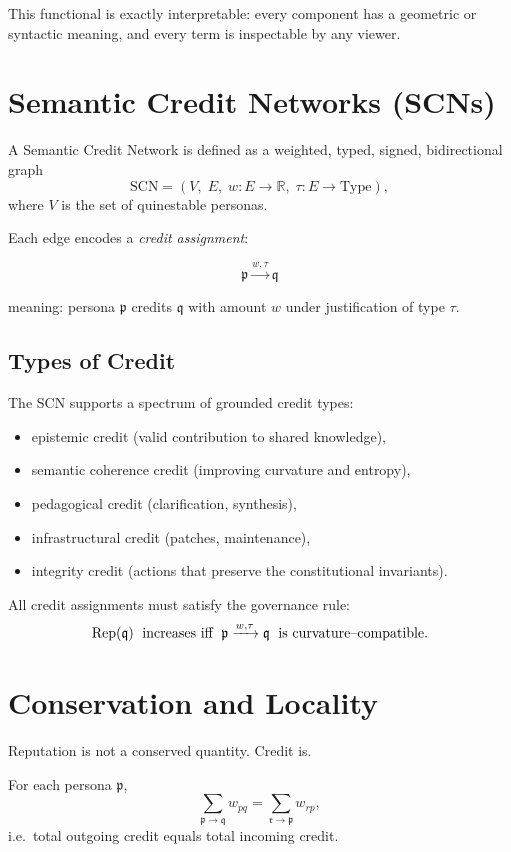 This functional is exactly interpretable:
every component has a geometric or syntactic meaning,
and every term is inspectable by any viewer.

\section{Semantic Credit Networks (SCNs)}

A Semantic Credit Network is defined as a weighted, typed, signed, bidirectional graph
\[
\mathrm{SCN} = \left(
V,\; E,\; w: E \to \mathbb{R},\; \tau: E \to \mathrm{Type}
\right),
\]
where $V$ is the set of quine\textendash stable personas.

Each edge encodes a \emph{credit assignment}:

\[
\mathfrak{p} \xrightarrow{w,\tau} \mathfrak{q}
\]

meaning:
persona $\mathfrak{p}$ credits $\mathfrak{q}$ with amount $w$
under justification of type $\tau$.

\subsection{Types of Credit}

The SCN supports a spectrum of grounded credit types:
\begin{itemize}
  \item epistemic credit (valid contribution to shared knowledge),
  \item semantic coherence credit (improving curvature and entropy),
  \item pedagogical credit (clarification, synthesis),
  \item infrastructural credit (patches, maintenance),
  \item integrity credit (actions that preserve the constitutional invariants).
\end{itemize}

All credit assignments must satisfy the governance rule:
\[
\operatorname{Rep}(\mathfrak{q}) \;\text{ increases iff }\;
\mathfrak{p} \xrightarrow{w,\tau} \mathfrak{q}
\;\text{ is curvature\textendash compatible}.
\]

\section{Conservation and Locality}

Reputation is not a conserved quantity.  
Credit is.

\begin{definition}
For each persona $\mathfrak{p}$,
\[
\sum_{\mathfrak{p}\rightarrow \mathfrak{q}} w_{pq}
 = \sum_{\mathfrak{r}\rightarrow \mathfrak{p}} w_{r p},
\]
i.e.\ total outgoing credit equals total incoming credit.
\end{definition}

